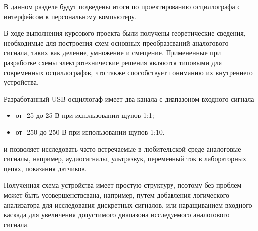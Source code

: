
В данном разделе будут подведены итоги по проектированию осциллографа с интерфейсом к персональному компьютеру.

В ходе выполнения курсового проекта были получены теоретические сведения, необходимые для построения схем основных преобразований аналогового сигнала, таких как деление, умножение и смещение.
Примененные при разработке схемы электротехнические решения являются типовыми для современных осциллографов, что также способствует пониманию их внутреннего устройства.

Разработанный USB-осциллогаф имеет два канала с диапазоном входного сигнала
\begin{itemize}
    \item от -25 до 25 В при использовании щупов 1:1;
    \item от -250 до 250 В при использовании щупов 1:10.
\end{itemize}
и позволяет исследовать часто встречаемые в любительской среде аналоговые сигналы, например, аудиосигналы, ультразвук, переменный ток в лабораторных цепях, показания датчиков.

Полученная схема устройства имеет простую структуру, поэтому без проблем может быть усовершенствована, например, путем добавления логического анализатора для исследования дискретных сигналов, или наращиванием входного каскада для увеличения допустимого диапазона исследуемого аналогового сигнала.